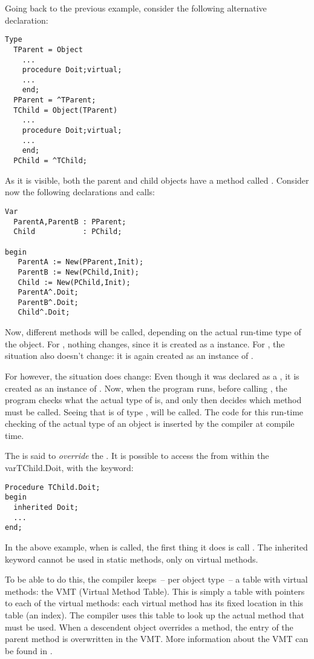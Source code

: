 Going back to the previous example, consider the following alternative
declaration:
\begin{verbatim}
Type
  TParent = Object
    ...
    procedure Doit;virtual;
    ...
    end;
  PParent = ^TParent;
  TChild = Object(TParent)
    ...
    procedure Doit;virtual;
    ...
    end;
  PChild = ^TChild;
\end{verbatim}
As it is visible, both the parent and child objects have a method called
. Consider now the following declarations and calls:
\begin{verbatim}
Var
  ParentA,ParentB : PParent;
  Child           : PChild;

begin
   ParentA := New(PParent,Init);
   ParentB := New(PChild,Init);
   Child := New(PChild,Init);
   ParentA^.Doit;
   ParentB^.Doit;
   Child^.Doit;
\end{verbatim}
Now, different methods will be called, depending on the actual run-time type
of the object. For , nothing changes, since it is created as
a  instance. For , the situation also doesn't
change: it is again created as an instance of .

For  however, the situation does change: Even though it was
declared as a , it is created as an instance of .
Now, when the program runs, before calling , the program
checks what the actual type of  is, and only then decides which
method must be called. Seeing that  is of type ,
 will be called. The code for this run-time checking of the actual type of an object is
inserted by the compiler at compile time.

The  is said to {\em override} the
.  
It is possible to access the  from within the
var{TChild.Doit}, with the  keyword:
\begin{verbatim}
Procedure TChild.Doit;
begin
  inherited Doit;
  ...
end;
\end{verbatim}
In the above example, when  is called, the first thing it
does is call .  The inherited keyword cannot be used in
static methods, only on virtual methods.

To be able to do this, the compiler keeps~-- per object type~-- a table with
virtual methods: the VMT (Virtual Method Table). This is simply a table
with pointers to each of the virtual methods: each virtual method has its
fixed location in this table (an index). The compiler uses this table to
look up the actual method that must be used. When a descendent object
overrides a method, the entry of the parent method is overwritten in the
VMT. More information about the VMT can be found in \progref.

